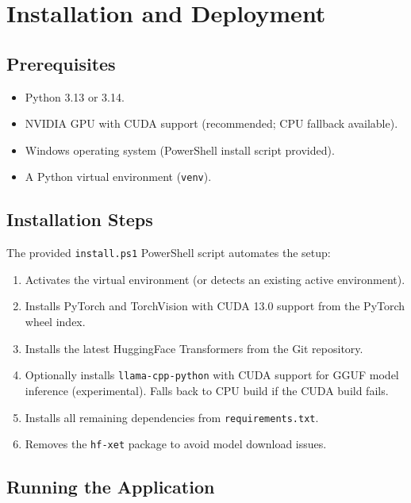 \documentclass[12pt,a4paper]{article}
\begin{document}
\section{Installation and Deployment}

\subsection{Prerequisites}

\begin{itemize}[noitemsep]
    \item Python 3.13 or 3.14.
    \item NVIDIA GPU with CUDA support (recommended; CPU fallback available).
    \item Windows operating system (PowerShell install script provided).
    \item A Python virtual environment (\texttt{venv}).
\end{itemize}

\subsection{Installation Steps}

The provided \texttt{install.ps1} PowerShell script automates the setup:

\begin{enumerate}
    \item Activates the virtual environment (or detects an existing active environment).
    \item Installs PyTorch and TorchVision with CUDA 13.0 support from the PyTorch wheel index.
    \item Installs the latest HuggingFace Transformers from the Git repository.
    \item Optionally installs \texttt{llama-cpp-python} with CUDA support for GGUF model inference (experimental). Falls back to CPU build if the CUDA build fails.
    \item Installs all remaining dependencies from \texttt{requirements.txt}.
    \item Removes the \texttt{hf-xet} package to avoid model download issues.
\end{enumerate}

\subsection{Running the Application}
\end{document}
